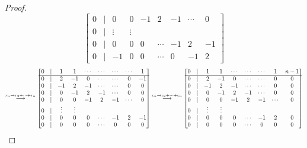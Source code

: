\documentclass[11pt,reqno]{amsart}
\newcommand\scalemath[2]{\scalebox{#1}{\mbox{\ensuremath{\displaystyle #2}}}}
\theoremstyle{definition}
\theoremstyle{plain}
\begin{document}
\begin{proof}
\[{\begin{bmatrix}
0 & | & 0 & 0 & - 1& 2 & -1 & \cdots & 0 \\
0 & | & \vdots & \vdots \\
0 & | & 0 & 0 & 0 & \cdots & -1& 2 & -1 \\
0 & | & -1 & 0 & 0 & \cdots& 0 & -1 & 2 
\end{bmatrix} }
\]
\vspace{0.2cm}
\[
\scalemath{0.85}{ \stackrel{r_n \to r_2 + \cdots + r_{n}}\longrightarrow
\begin{bmatrix}
0 & | & 1 & 1 & \cdots & \cdots & \cdots & \cdots & 1 \\
\hline
0 & | & 2 & -1 & 0 & \cdots & \cdots & 0 & -1 \\
0 & | & - 1& 2 & -1 & \cdots & \cdots & 0 & 0 \\
0 & | & 0 & - 1& 2 & -1 & \cdots & 0 & 0 \\
0 & | & 0 & 0 & - 1& 2 & -1 & \cdots & 0 \\
0 & | & \vdots & \vdots \\
0 & | & 0 & 0 & 0 & \cdots & -1& 2 & -1 \\
0 & | & 0 & 0 & 0 & \cdots& 0 & 0 & 0
\end{bmatrix}
\stackrel{c_n \to c_2 + \cdots + c_{n}}\longrightarrow
\begin{bmatrix}
0 & | & 1 & 1 & \cdots & \cdots & \cdots & 1 & n-1 \\
\hline
0 & | & 2 & -1 & 0 & \cdots & \cdots & 0 & 0 \\
0 & | & - 1& 2 & -1 & \cdots & \cdots & 0 & 0 \\
0 & | & 0 & - 1& 2 & -1 & \cdots & 0 & 0 \\
0 & | & 0 & 0 & - 1& 2 & -1 & \cdots & 0 \\
0 & | & \vdots & \vdots \\
0 & | & 0 & 0 & 0 & \cdots & -1& 2 & 0 \\
0 & | & 0 & 0 & 0 & \cdots& 0 & 0 & 0
\end{bmatrix} }
\]

\end{proof}
\end{document}
